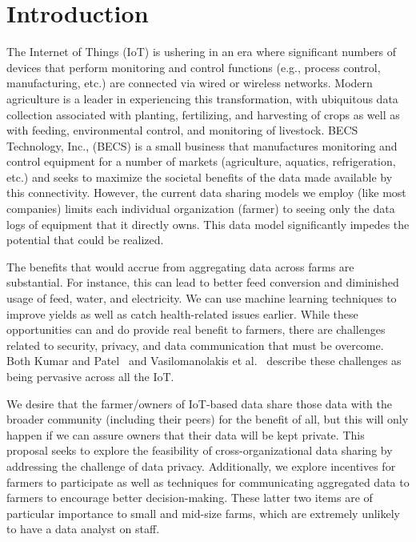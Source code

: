 \section{Introduction}
\label{sec:intro}

The Internet of Things (IoT) is ushering in an era where significant numbers
of devices that perform monitoring and control functions (e.g., process control,
manufacturing, etc.) are connected via wired or wireless networks.
Modern agriculture is a leader in experiencing this transformation,
with ubiquitous data collection associated with planting, fertilizing,
and harvesting of crops as well as with feeding, environmental control,
and monitoring of livestock.
BECS Technology, Inc., (BECS) is a small business that manufactures 
monitoring and control equipment for a number of markets
(agriculture, aquatics, refrigeration, etc.) and seeks to maximize the
societal benefits of the data made available by this connectivity.
However, the current data sharing models we employ (like most companies)
limits each individual organization (farmer) to seeing only the data
logs of equipment that it directly owns. 
This data model significantly impedes the potential that could
be realized.

The benefits that would accrue from
aggregating data across farms are substantial.
For instance, this can lead to better
feed conversion and
diminished usage of feed, water, and electricity.
We can use machine learning techniques to improve yields as well as
catch health-related issues earlier.
While these opportunities can and do provide real benefit to farmers,
there are challenges related to security, privacy, and data communication that
must be overcome.
Both Kumar and Patel~\cite{kp14} and
Vasilomanolakis et al.~\cite{vdlgw15} describe these challenges as being
pervasive across all the IoT.

We desire that the farmer/owners of IoT-based data share those data with
the broader community (including their peers) for the benefit of all,
but this will only happen if we can assure owners that their data will
be kept private.
This proposal seeks to explore the feasibility of cross-organizational
data sharing by addressing the challenge of data privacy.
Additionally, we explore incentives for farmers to participate as well
as techniques for communicating aggregated data
to farmers to encourage better decision-making.
These latter two items are of particular importance to small and mid-size
farms, which are extremely unlikely to have a data analyst on staff.

